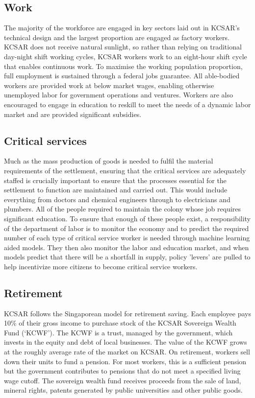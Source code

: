 \documentclass[fleqn,10pt]{Stylesheet} %
\begin{document}
\subsection{Work}
The majority of the workforce are engaged in key sectors laid out in KCSAR's technical design and the largest proportion are engaged as factory workers. KCSAR does not receive natural sunlight, so rather than relying on traditional day-night shift working cycles, KCSAR workers work to an eight-hour shift cycle that enables continuous work. To maximise the working population proportion, full employment is sustained through a federal jobs guarantee. All able-bodied workers are provided work at below market wages, enabling otherwise unemployed labor for government operations and ventures. Workers are also encouraged to engage in education to reskill to meet the needs of a dynamic labor market and are provided significant subsidies.   

\subsection{Critical services}
Much as the mass production of goods is needed to fulfil the material requirements of the settlement, ensuring that the critical services are adequately staffed is crucially important to ensure that the processes essential for the settlement to function are maintained and carried out. This would include everything from doctors and chemical engineers through to electricians and plumbers. All of the people required to maintain the colony whose job requires significant education. To ensure that enough of these people exist, a responsibility of the department of labor is to monitor the economy and to predict the required number of each type of critical service worker is needed through machine learning aided models. They then also monitor the labor and education market, and when models predict that there will be a shortfall in supply, policy 'levers' are pulled to help incentivize more citizens to become critical service workers.


\subsection{Retirement}
KCSAR follows the Singaporean model for retirement saving. Each employee pays 10\% of their gross income to purchase stock of the KCSAR Sovereign Wealth Fund (‘KCWF’). The KCWF is a trust, managed by the government, which invests in the equity and debt of local businesses. The value of the KCWF grows at the roughly average rate of the market on KCSAR. On retirement, workers sell down their units to fund a pension. For most workers, this is a sufficient pension but the government contributes to pensions that do not meet a specified living wage cutoff. The sovereign wealth fund receives proceeds from the sale of land, mineral rights, patents generated by public universities and other public goods.
\end{document}
